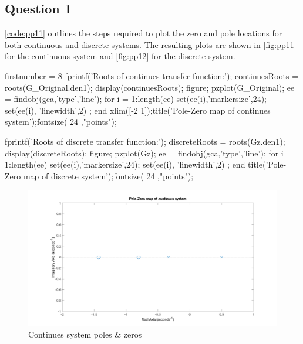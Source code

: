 \FloatBarrier
\subsection{Question 1}
\autoref{code:pp11} outlines the steps required to plot the zero and pole locations for both continuous and discrete systems. The resulting plots are shown in \autoref{fig:pp11} for the continuous system and \autoref{fig:pp12} for the discrete system.

\begin{code}
	\begin{matlabcode}{firstnumber = 8}
fprintf('Roots of continues transfer function:\n');
continuesRoots = roots(G_Original.den{1});
display(continuesRoots);
figure;
pzplot(G_Original);
ee = findobj(gca,'type','line');
for i = 1:length(ee)
	set(ee(i),'markersize',24); 
	set(ee(i), 'linewidth',2) ; 
end
xlim([-2 1]);title('Pole-Zero map of continues system');fontsize( 24 ,"points");

fprintf('Roots of discrete transfer function:\n');
discreteRoots = roots(Gz.den{1});
display(discreteRoots);
figure;
pzplot(Gz);
ee = findobj(gca,'type','line');
for i = 1:length(ee)
	set(ee(i),'markersize',24); 
	set(ee(i), 'linewidth',2) ; 
end
title('Pole-Zero map of discrete system');fontsize( 24 ,"points");
	\end{matlabcode}
	\label{code:pp11}
\end{code}

\begin{figure}
	\centering
	\includegraphics[width=\textwidth]{images/pp11.png}
	\caption{Continues system poles \& zeros}
	\label{fig:pp11}
\end{figure}

